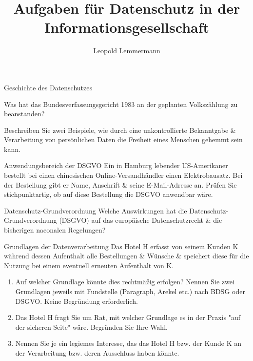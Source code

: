 \documentclass{exercisesheet}
\title{Aufgaben für Datenschutz in der Informationsgesellschaft}
\author{Leopold Lemmermann}
\begin{document}
\createtitle

  \begin{exercise}{Geschichte des Datenschutzes}
      \item Was hat das Bundesverfassungsgericht 1983 an der geplanten Volkszählung zu beanstanden?
      \item Beschreiben Sie zwei Beispiele, wie durch eine unkontrollierte Bekanntgabe \& Verarbeitung von persönlichen Daten die Freiheit eines Menschen gehemmt sein kann.
  \end{exercise}

  \begin{exercise*}{Anwendungsbereich der DSGVO}
    Ein in Hamburg lebender US-Amerikaner bestellt bei einen chinesischen Online-Versandhändler einen Elektrobausatz. Bei der Bestellung gibt er Name, Anschrift \& seine E-Mail-Adresse an. Prüfen Sie stichpunktartig, ob auf diese Bestellung die DSGVO anwendbar wäre.
  \end{exercise*}

  \begin{exercise*}{Datenschutz-Grundverordnung}
    Welche Auswirkungen hat die Datenschutz-Grundverordnung (DSGVO) auf das europäische Datenschutzrecht \& die bisherigen naeonalen Regelungen?
  \end{exercise*}

  \begin{exercise*}{Grundlagen der Datenverarbeitung}
    Das Hotel H erfasst von seinem Kunden K während dessen Aufenthalt alle Bestellungen \& Wünsche \& speichert diese für die Nutzung bei einem eventuell erneuten Aufenthalt von K.
    \begin{enumerate}
      \item Auf welcher Grundlage könnte dies rechtmäßig erfolgen? Nennen Sie zwei Grundlagen jeweils mit Fundstelle (Paragraph, Arekel etc.) nach BDSG oder DSGVO. Keine Begründung erforderlich.
      \item Das Hotel H fragt Sie um Rat, mit welcher Grundlage es in der Praxis "auf der sicheren Seite" wäre. Begründen Sie Ihre Wahl.
      \item Nennen Sie je ein legiemes Interesse, das das Hotel H bzw. der Kunde K an der Verarbeitung bzw. deren Ausschluss haben könnte.
    \end{enumerate}
  \end{exercise*}
\end{document}
